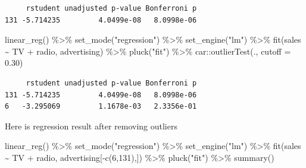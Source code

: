 \documentclass[
  letterpaper,
  DIV=11,
  numbers=noendperiod]{scrreprt}
\newenvironment{Shaded}{\begin{snugshade}}{\end{snugshade}}
\newcommand{\AttributeTok}[1]{\textcolor[rgb]{0.65,0.35,0.00}{#1}}
\newcommand{\DecValTok}[1]{\textcolor[rgb]{0.47,0.16,0.63}{#1}}
\newcommand{\FloatTok}[1]{\textcolor[rgb]{0.65,0.35,0.00}{#1}}
\newcommand{\FunctionTok}[1]{\textcolor[rgb]{0.02,0.16,0.49}{#1}}
\newcommand{\NormalTok}[1]{\textcolor[rgb]{0.33,0.33,0.33}{#1}}
\newcommand{\SpecialCharTok}[1]{\textcolor[rgb]{0.00,0.46,0.62}{#1}}
\newcommand{\StringTok}[1]{\textcolor[rgb]{0.00,0.50,0.00}{#1}}
\begin{document}
\begin{verbatim}
     rstudent unadjusted p-value Bonferroni p
131 -5.714235         4.0499e-08   8.0998e-06
\end{verbatim}

\begin{Shaded}
\begin{Highlighting}[]
\FunctionTok{linear\_reg}\NormalTok{() }\SpecialCharTok{\%\textgreater{}\%} 
  \FunctionTok{set\_mode}\NormalTok{(}\StringTok{"regression"}\NormalTok{) }\SpecialCharTok{\%\textgreater{}\%} 
  \FunctionTok{set\_engine}\NormalTok{(}\StringTok{"lm"}\NormalTok{) }\SpecialCharTok{\%\textgreater{}\%} 
  \FunctionTok{fit}\NormalTok{(sales }\SpecialCharTok{\textasciitilde{}}\NormalTok{ TV }\SpecialCharTok{+}\NormalTok{ radio, advertising) }\SpecialCharTok{\%\textgreater{}\%} 
  \FunctionTok{pluck}\NormalTok{(}\StringTok{"fit"}\NormalTok{) }\SpecialCharTok{\%\textgreater{}\%} 
\NormalTok{  car}\SpecialCharTok{::}\FunctionTok{outlierTest}\NormalTok{(., }\AttributeTok{cutoff =} \FloatTok{0.30}\NormalTok{)}
\end{Highlighting}
\end{Shaded}

\begin{verbatim}
     rstudent unadjusted p-value Bonferroni p
131 -5.714235         4.0499e-08   8.0998e-06
6   -3.295069         1.1678e-03   2.3356e-01
\end{verbatim}

Here is regression result after removing outliers

\begin{Shaded}
\begin{Highlighting}[]
\FunctionTok{linear\_reg}\NormalTok{() }\SpecialCharTok{\%\textgreater{}\%} 
  \FunctionTok{set\_mode}\NormalTok{(}\StringTok{"regression"}\NormalTok{) }\SpecialCharTok{\%\textgreater{}\%} 
  \FunctionTok{set\_engine}\NormalTok{(}\StringTok{"lm"}\NormalTok{) }\SpecialCharTok{\%\textgreater{}\%} 
  \FunctionTok{fit}\NormalTok{(sales }\SpecialCharTok{\textasciitilde{}}\NormalTok{ TV }\SpecialCharTok{+}\NormalTok{ radio, advertising[}\SpecialCharTok{{-}}\FunctionTok{c}\NormalTok{(}\DecValTok{6}\NormalTok{,}\DecValTok{131}\NormalTok{),]) }\SpecialCharTok{\%\textgreater{}\%} 
  \FunctionTok{pluck}\NormalTok{(}\StringTok{"fit"}\NormalTok{) }\SpecialCharTok{\%\textgreater{}\%} 
  \FunctionTok{summary}\NormalTok{()}
\end{Highlighting}
\end{Shaded}
\end{document}
